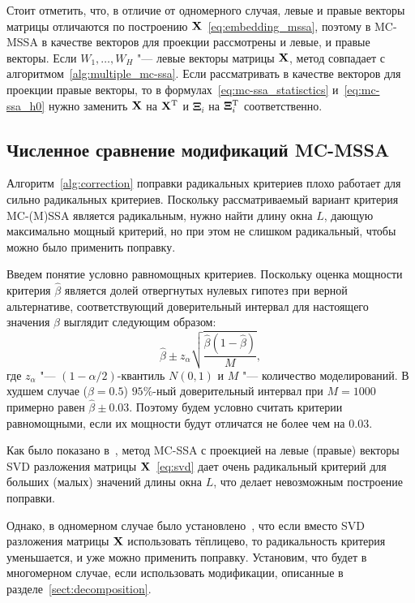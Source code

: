 \documentclass[specialist,
substylefile = spbu_report.rtx,
subf,href,colorlinks=true, 12pt]{disser}
\theoremstyle{definition}
\begin{document}
Стоит отметить, что, в отличие от одномерного случая, левые и правые векторы матрицы отличаются по построению $\mathbf{X}$~\eqref{eq:embedding_mssa}, поэтому в MC-MSSA в качестве векторов для проекции рассмотрены и левые, и правые векторы. Если $W_1,\ldots,W_H$ "--- левые векторы матрицы $\mathbf{X}$, метод совпадает с алгоритмом~\ref{alg:multiple_mc-ssa}. Если рассматривать в качестве векторов для проекции правые векторы, то в формулах~\eqref{eq:mc-ssa_statisctics} и~\eqref{eq:mc-ssa_h0} нужно заменить $\mathbf{X}$ на $\mathbf{X}^{\mathrm{T}}$ и $\mathbf{\Xi}_i$ на $\mathbf{\Xi}_i^{\mathrm{T}}$ соответственно.

\subsection{Численное сравнение модификаций MC-MSSA}\label{sect:mc-mssa_numeric_comparison}
Алгоритм~\ref{alg:correction} поправки радикальных критериев плохо работает для сильно радикальных критериев. Поскольку рассматриваемый вариант критерия MC-(M)SSA является радикальным, нужно найти длину окна $L$, дающую максимально мощный критерий, но при этом не слишком радикальный, чтобы можно было применить поправку.

Введем понятие условно равномощных критериев. Поскольку оценка мощности критерия $\hat \beta$ является долей отвергнутых нулевых гипотез при верной альтернативе, соответствующий доверительный интервал для настоящего значения $\beta$ выглядит следующим образом:
\[
	\hat \beta \pm z_\alpha \sqrt{\frac{\hat \beta(1 - \hat \beta)}M},
\]
где $z_\alpha$ "--- $(1-\alpha/2)$-квантиль $N(0, 1)$ и $M$ "--- количество моделирований. В худшем случае ($\beta=0.5$) $95\%$-ный доверительный интервал при $M=1000$ примерно равен $\hat\beta \pm 0.03$. Поэтому будем условно считать критерии равномощными, если их мощности будут отличатся не более чем на $0.03$.

Как было показано в~\cite[Приложение  Б.2.4]{Larin_2022}, метод MC-SSA с проекцией на левые (правые) векторы SVD разложения матрицы $\mathbf{X}$~\eqref{eq:svd} дает очень радикальный критерий для больших (малых) значений длины окна $L$, что делает невозможным построение поправки.

Однако, в одномерном случае было установлено~\cite{Larin_2022}, что если вместо SVD разложения матрицы $\mathbf{X}$ использовать тёплицево, то радикальность критерия уменьшается, и уже можно применить поправку. Установим, что будет в многомерном случае, если использовать модификации, описанные в разделе~\ref{sect:decomposition}.
\end{document}
